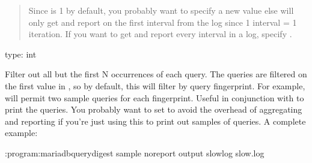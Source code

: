 \documentclass[letterpaper,10pt,english]{sphinxmanual}
\begin{document}
\begin{fulllineitems}
\begin{quote}
\sphinxAtStartPar
Since {\hyperref[\detokenize{mariadb-query-digest:cmdoption-mariadb-query-digest-iterations}]{}} is 1 by default, you probably want to specify
a new value else  will only get and report on the first
interval from the log since 1 interval = 1 iteration.  If you want to
get and report every interval in a log, specify {\hyperref[\detokenize{mariadb-query-digest:cmdoption-mariadb-query-digest-iterations}]{}} .
\end{quote}

\end{fulllineitems}


\begin{fulllineitems}
\label{\detokenize{mariadb-query-digest:cmdoption-mariadb-query-digest-sample}}
\sphinxAtStartPar
type: int

\sphinxAtStartPar
Filter out all but the first N occurrences of each query.  The queries are
filtered on the first value in {\hyperref[\detokenize{mariadb-query-digest:cmdoption-mariadb-query-digest-group-by}]{}}, so by default, this will filter
by query fingerprint.  For example,  will permit two sample queries
for each fingerprint.  Useful in conjunction with  to print
the queries.  You probably want to set  to avoid the overhead of
aggregating and reporting if you’re just using this to print out samples of
queries.  A complete example:

\begin{sphinxVerbatim}[commandchars=\\\{\}]
:program:mariadb\PYGZhy{}query\PYGZhy{}digest \PYGZhy{}\PYGZhy{}sample  \PYGZhy{}\PYGZhy{}no\PYGZhy{}report \PYGZhy{}\PYGZhy{}output slowlog slow.log
\end{sphinxVerbatim}

\end{fulllineitems}
\end{document}
